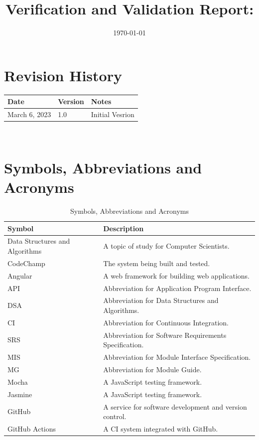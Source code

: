 \documentclass[12pt, titlepage]{article}
\begin{document}
\title{Verification and Validation Report: \progname} 
\author{\authname}
\date{\today}
	
\maketitle


\section{Revision History}

\begin{tabularx}{\textwidth}{p{3cm}p{2cm}X}
\toprule {\bf Date} & {\bf Version} & {\bf Notes}\\
\midrule
March 6, 2023 & 1.0 & Initial Vesrion\\
\bottomrule
\end{tabularx}

~\newpage

\section{Symbols, Abbreviations and Acronyms}

\renewcommand{\arraystretch}{1.2}

\begin{table}[H]
\begin{center}
\begin{tabular}{|p{3cm}|p{9cm}|}
\hline
  \textbf{Symbol} & \textbf{Description}\\
  \hline
  Data Structures and Algorithms & A topic of study for Computer Scientists.\\
  \hline
  CodeChamp & The system being built and tested.\\
  \hline
  Angular & A web framework for building web applications.\\
  \hline
  API & Abbreviation for Application Program Interface.\\
  \hline
  DSA & Abbreviation for Data Structures and Algorithms.\\
  \hline
  CI & Abbreviation for Continuous Integration.\\
  \hline
  SRS & Abbreviation for Software Requirements Specification.\\
  \hline
  MIS & Abbreviation for Module Interface Specification.\\
  \hline
  MG & Abbreviation for Module Guide.\\
  \hline
  Mocha & A JavaScript testing framework.\\
  \hline
  Jasmine &  A JavaScript testing framework.\\
  \hline
  GitHub & A service for software development and version control.\\
  \hline
  GitHub Actions & A CI system integrated with GitHub.\\
  \hline
\end{tabular}
\end{center}
\caption{Symbols, Abbreviations and Acronyms}            

\end{table}
\end{document}
